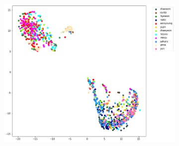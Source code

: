 \begin{enumerate}[left=0pt]
\begin{figure}[htbp]
\begin{subfigure}{0.325\textwidth}
    \end{subfigure}
    \hfill
    \begin{subfigure}{0.325\textwidth}
        \centering
        \includegraphics[trim=30 20 100 0, clip, width=\textwidth]{images/faceReco/nn1-and-binary/tsne-3.png}     
    \end{subfigure}


\end{figure}
\end{enumerate}
